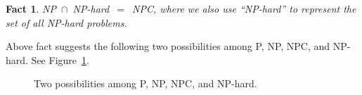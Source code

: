 \documentclass[letterpaper,11pt]{article}
\theoremstyle{mytheorem}
\newtheorem{fact}{Fact}
\begin{document}
\begin{fact}
NP{}~$\cap${}~NP-hard{}~$=${}~NPC, where we also use ``NP-hard'' to represent the set of all NP-hard problems.
\end{fact}

Above fact suggests the following two possibilities among P, NP, NPC, and NP-hard. See Figure~\ref{fig:nphard}.

\begin{figure}[!h]
\centering{}
\vspace*{-0.1cm}
\caption{Two possibilities among P, NP, NPC, and NP-hard.}
\label{fig:nphard}
\end{figure}
\end{document}

